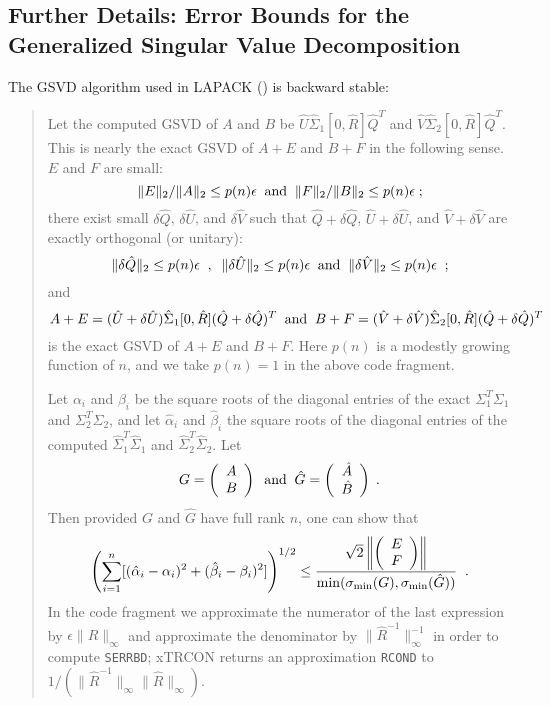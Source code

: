 \subsection{Further Details:  Error Bounds for the Generalized Singular Value Decomposition}

The GSVD algorithm used in LAPACK (\cite{paige86a,baidemmel92b,baizha93})
is backward stable:

\begin{quote}

Let the computed GSVD of $A$ and $B$ be $\hat{U} \hat{\Sigma}_1 [0,\hat{R}] \hat{Q}^T$ and
$\hat{V} \hat{\Sigma}_2 [0,\hat{R}] \hat{Q}^T$.
This is nearly the exact GSVD of
$A+E$ and $B+F$ in the following sense. $E$ and $F$ are small:
\[
\|E\|_2 / \|A\|_2 \leq p(n) \epsilon \; \; {\rm and} \; \;
\|F\|_2 / \|B\|_2 \leq p(n) \epsilon  \; ;
\]
there exist small
$\delta \hat{Q}$, $\delta \hat{U}$, and $\delta \hat{V}$
such that
$\hat{Q} + \delta \hat{Q}$,
$\hat{U} + \delta \hat{U}$, and
$\hat{V} + \delta \hat{V}$ are exactly orthogonal (or unitary):
\[
\| \delta \hat{Q} \|_2 \leq p(n) \epsilon \; \; , \; \;
\| \delta \hat{U} \|_2 \leq p(n) \epsilon \; \; {\rm and} \; \;
\| \delta \hat{V} \|_2 \leq p(n) \epsilon \; \; ;
\]
and
\[
A + E = ( \hat{U} + \delta \hat{U} ) \hat{\Sigma}_1 [ 0, \hat{R}] (\hat{Q} + \delta \hat{Q})^T
\; \; {\rm and} \; \;
B + F = ( \hat{V} + \delta \hat{V} ) \hat{\Sigma}_2 [ 0, \hat{R}] (\hat{Q} + \delta \hat{Q})^T
\]
is the exact GSVD of $A+E$ and $B+F$. Here $p(n)$ is a modestly growing function of $n$, and
we take $p(n)=1$ in the above code fragment.

Let $\alpha_i$ and $\beta_i$ be the square roots of the diagonal entries of the exact
$\Sigma_1^T \Sigma_1$ and $\Sigma_2^T \Sigma_2$,
and let $\hat{\alpha}_i$ and $\hat{\beta}_i$ the square roots of the diagonal entries
of the computed $\hat{\Sigma}_1^T \hat{\Sigma}_1$ and $\hat{\Sigma}_2^T \hat{\Sigma}_2$.
Let
\[
G = \bmat{c} A \\ B \emat \; \; {\rm and} \; \; \hat{G} = \bmat{c} \hat{A} \\ \hat{B} \emat \; .
\]
Then provided $G$ and $\hat{G}$ have full rank $n$, one can show \cite{sun83,paige84} that
\[
\left( \sum_{i=1}^n [( \hat{\alpha}_i - \alpha_i )^2 +
                    ( \hat{\beta}_i - \beta_i )^2 ]  \right)^{1/2} \leq
\frac{\sqrt{2} \left\| \bmat{c} E \\ F \emat \right\|}
{\min ( \sigma_{\min} (G) , \sigma_{\min} (\hat{G}) )}  \; \; .
\]
In the code fragment we approximate the numerator of the last expression by
$\epsilon \|\hat{R}\|_{\infty}$ and approximate the denominator by
$\| \hat{R}^{-1} \|^{-1}_{\infty}$ in order to compute {\tt SERRBD};
xTRCON returns an approximation {\tt RCOND} to
$1/ (\| \hat{R}^{-1} \|_{\infty} \| \hat{R} \|_{\infty})$.
\end{quote}

